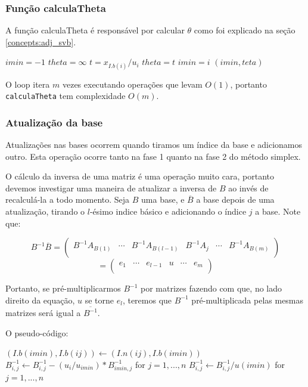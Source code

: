 \documentclass[12pt]{article}
\begin{document}
\subsubsection{Função calculaTheta}
A função calculaTheta é responsável por calcular $\theta$ como foi explicado na seção \ref{concepts:adj_svb}.
\begin{algorithmic}
	\State $imin = -1$
	\State $theta = \infty$
			\State $t = x_{I.b(i)} / u_i$
				\State $theta = t$
				\State $imin = i$
			\EndIf
		\EndIf
	\EndFor
	\Return $(imin, teta)$
\EndFunction
\end{algorithmic}

O loop itera $m$ vezes executando operações que levam $O(1)$, portanto \texttt{calculaTheta} tem complexidade $O(m)$.


\subsubsection{Atualização da base}
Atualizações nas bases ocorrem quando tiramos um índice da base e adicionamos outro. Esta operação ocorre tanto na fase 1 quanto na fase 2 do método simplex.

O cálculo da inversa de uma matriz é uma operação muito cara, portanto devemos investigar uma maneira de atualizar a inversa de $B$ ao invés de recalculá-la a todo momento. Seja $B$ uma base, e $\overline{B}$ a base depois de uma atualização, tirando o $l$-ésimo indice básico e adicionando o índice $j$ a base. Note que:
\begin{center}
$$
B^{-1}\overline{B} =
\begin{pmatrix}
B^{-1}A_{B(1)}  & \cdots & B^{-1}A_{B(l - 1)} & B^{-1}A_j & \cdots & B^{-1}A_{B(m)} \\    
\end{pmatrix}
$$
$$
=\begin{pmatrix}
e_1  & \cdots & e_{l-1} & u & \cdots & e_m \\    
\end{pmatrix}
$$
\end{center}
Portanto, se pré-multiplicarmos $B^{-1}$ por matrizes fazendo com que, no lado direito da equação, $u$ se torne $e_l$, teremos que $B^{-1}$ pré-multiplicada pelas mesmas matrizes será igual a $\overline{B^{-1}}$.

O pseudo-código:
\begin{algorithmic}
\State $(I.b(imin), I.b(ij)) \gets (I.n(ij), I.b(imin))$
	\If{$i \neq imin$}
		\State $B^{-1}_{i, j} \gets B^{-1}_{i, j} - (u_i / u_{imin}) * B^{-1}_{imin, j}$ for $j = 1, ..., n$
	\EndIf
\EndFor
\State $B^{-1}_{i, j} \gets B^{-1}_{i, j} / u(imin)$ for $j = 1, ..., n$
\EndFunction
\end{algorithmic}
\end{document}
